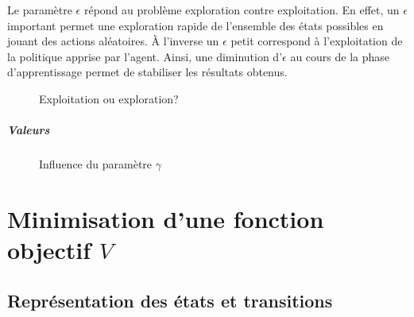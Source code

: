 \documentclass{report}
\begin{document}

Le paramètre \(\epsilon\) répond au problème exploration contre exploitation. En
effet, un \(\epsilon\) important permet une exploration rapide de l'ensemble
des états possibles en jouant des actions aléatoires. À l'inverse un \(\epsilon\)
petit correspond à l'exploitation de la politique apprise par l'agent. Ainsi,
une diminution d'\(\epsilon\) au cours de la phase d'apprentissage permet de
stabiliser les résultats obtenus.

\begin{figure}
  \centering
  \caption{Exploitation ou exploration?}
\end{figure}

\paragraph{Valeurs}
\begin{figure}
  \centering
  \caption{Influence du paramètre \(\gamma\)}
\end{figure}



\chapter{Minimisation d'une fonction objectif \( V \)}

\section{Représentation des états et transitions}
\end{document}

